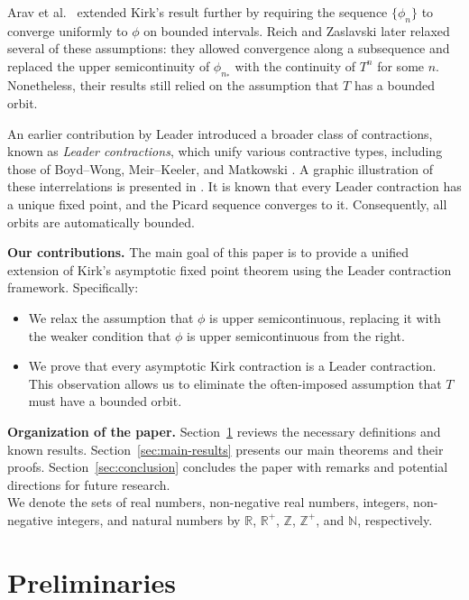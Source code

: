 \documentclass{birkjour}
\theoremstyle{definition}
\theoremstyle{remark}
\numberwithin{equation}{section}
\begin{document}
Arav et al.\ \cite{arav2007} extended Kirk’s result further by requiring the sequence $\{\phi_n\}$ to converge uniformly to $\phi$ on bounded intervals. Reich and Zaslavski \cite{reich2008} later relaxed several of these assumptions: they allowed convergence along a subsequence and replaced the upper semicontinuity of $\phi_{n_*}$ with the continuity of $T^n$ for some $n$. Nonetheless, their results still relied on the assumption that $T$ has a bounded orbit.

An earlier contribution by Leader introduced a broader class of contractions, known as \emph{Leader contractions}, which unify various contractive types, including those of Boyd–Wong, Meir–Keeler, and Matkowski \cite{leader1983equivalent}. A graphic illustration of these interrelations is presented in \cite{jachymski2011equivalent}. It is known that every Leader contraction has a unique fixed point, and the Picard sequence converges to it. Consequently, all orbits are automatically bounded.

\medskip

\noindent\textbf{Our contributions.} The main goal of this paper is to provide a unified extension of Kirk's asymptotic fixed point theorem using the Leader contraction framework. Specifically:
\begin{itemize}
    \item We relax the assumption that $\phi$ is upper semicontinuous, replacing it with the weaker condition that $\phi$ is upper semicontinuous from the right.
    \item We prove that every asymptotic Kirk contraction is a Leader contraction. This observation allows us to eliminate the often-imposed assumption that $T$ must have a bounded orbit.
\end{itemize}

\medskip

\noindent\textbf{Organization of the paper.} Section~\ref{sec:prelim} reviews the necessary definitions and known results. Section~\ref{sec:main-results} presents our main theorems and their proofs. Section~\ref{sec:conclusion} concludes the paper with remarks and potential directions for future research.\\
We denote the sets of real numbers, non-negative real numbers, integers, non-negative integers, and natural numbers by $\mathbb{R}$, $\mathbb{R}^{+}$, $\mathbb{Z}$, $\mathbb{Z}^{+}$, and $\mathbb{N}$, respectively.
\section{Preliminaries}\label{sec:prelim}
\end{document}
